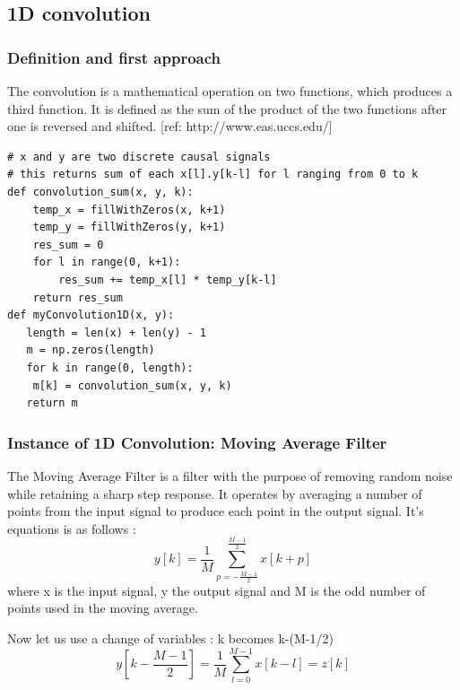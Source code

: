 \documentclass[a4paper,10pt]{article}
\begin{document}
	
	
    \subsection{1D convolution}
	\subsubsection{Definition and first approach}
	The convolution is a mathematical operation on two functions, which produces a third function. It is defined as the sum of the product of the two functions after one is reversed and shifted.
	[ref: http://www.eas.uccs.edu/]\newline
	\begin{lstlisting}
# x and y are two discrete causal signals
# this returns sum of each x[l].y[k-l] for l ranging from 0 to k
def convolution_sum(x, y, k):
	temp_x = fillWithZeros(x, k+1)
	temp_y = fillWithZeros(y, k+1)
	res_sum = 0
	for l in range(0, k+1):
		res_sum += temp_x[l] * temp_y[k-l]
	return res_sum
def myConvolution1D(x, y):
   length = len(x) + len(y) - 1
   m = np.zeros(length)
   for k in range(0, length):
   	m[k] = convolution_sum(x, y, k)
   return m
   \end{lstlisting}
	\subsubsection{Instance of 1D Convolution: Moving Average Filter}
	The Moving Average Filter is a filter with the purpose of removing random noise while retaining a sharp step response. It operates by averaging a number of points from the input signal to produce each point in the output signal.\newline
	It's equations is as follows :
	\begin{equation}
    y[k] = \frac{1}{M} \sum_{p=-\frac{M-1}{2}}^{\frac{M-1}{2}} x[k+p]
\end{equation}	\newline
where x is the input signal, y the output signal and M is the odd number of points used in the moving average.

Now let us use a change of variables : k becomes k-(M-1/2)\newline
\begin{equation}
    y[k - \frac{M-1}{2}] = \frac{1}{M} \sum_{l=0}^{M-1} x[k-l] = z[k]
\end{equation}
\end{document}
